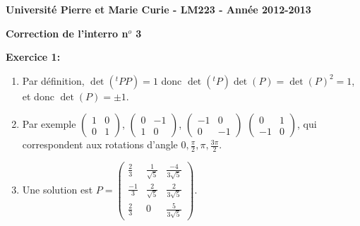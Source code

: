 \documentclass[a4paper, 10pt]{article}
\theoremstyle{plain}
\begin{document}
\noindent
\large
\textbf{Universit\'e Pierre et Marie Curie 
 - LM223 -
Ann\'ee 2012-2013}\\

\begin{center}
\Large
\textbf{Correction de l'interro n$^o$ 3}
\end{center}
\normalsize

\medskip
\noindent
\textbf{Exercice 1:}\\
\begin{enumerate}
\item
Par définition, $\det(^tPP)=1$ donc 
$\det (^tP)\det(P)= \det(P)^2 =1$, et donc $\det(P) =\pm1$.


\item 
Par exemple 
$\begin{pmatrix}
1&0\\
0&1
\end{pmatrix}$,
$\begin{pmatrix}
0&-1\\
1&0
\end{pmatrix}$,
$\begin{pmatrix}
-1&0\\0&-1
\end{pmatrix}$
$\begin{pmatrix}
0&1\\-1&0
\end{pmatrix}$, qui correspondent aux rotations d'angle $0,\frac{\pi}{2}, \pi , \frac{3\pi}{2}$.

\item 
Une solution est 
$P = 
\begin{pmatrix}
\frac{2}{3} & \frac{1}{\sqrt{5}} & \frac{-4}{3\sqrt{5}} \\[3pt]
\frac{-1}{3} & \frac{2}{\sqrt{5}} & \frac{2}{3\sqrt{5}} \\[3pt]
\frac{2}{3} & 0 & \frac{5}{3\sqrt{5}} 
\end{pmatrix}$.

\end{enumerate}
\end{document}
